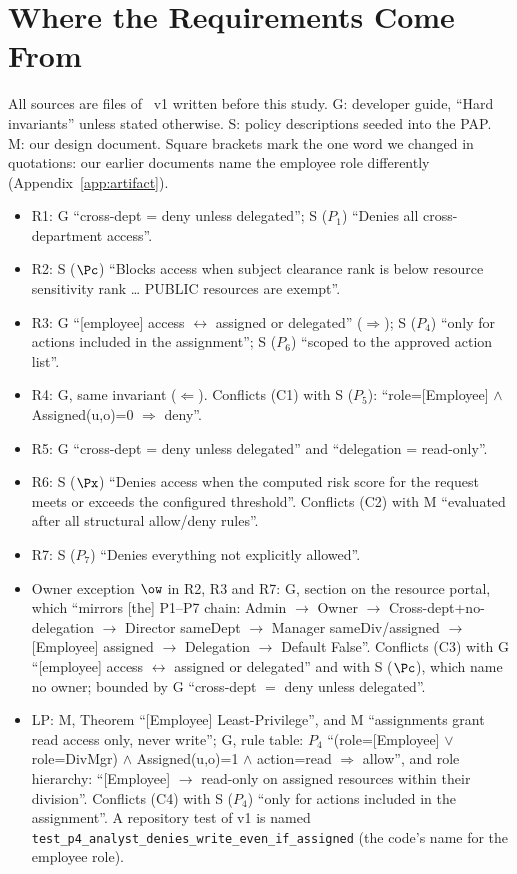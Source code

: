 


\appendix
\section{Where the Requirements Come From}
\label{app:prov}
All sources are files of \sysname~v1 written before this study. G: developer guide, ``Hard invariants'' unless
stated otherwise.
S: policy descriptions seeded into the PAP. M: our design document. Square brackets mark the one word we changed
in quotations: our earlier documents name the employee role differently (Appendix~\ref{app:artifact}).
\begin{itemize}
\item R1: G ``cross-dept = deny unless delegated''; S ($P_1$) ``Denies all cross-department access''.
\item R2: S ($\Pc$) ``Blocks access when subject clearance rank is below resource sensitivity rank \ldots{} PUBLIC
resources are exempt''.
\item R3: G ``[employee] access $\leftrightarrow$ assigned or delegated'' ($\Rightarrow$); S ($P_4$) ``only for actions
included in the assignment''; S ($P_6$) ``scoped to the approved action list''.
\item R4: G, same invariant ($\Leftarrow$). Conflicts (C1) with S ($P_5$):
``role=[Employee] $\wedge$ Assigned(u,o)=0 $\Rightarrow$\allowbreak{} deny''.
\item R5: G ``cross-dept = deny unless delegated'' and ``delegation = read-only''.
\item R6: S ($\Px$) ``Denies access when the computed risk score for the request meets or exceeds the configured
threshold''. Conflicts (C2) with M ``evaluated after all structural allow/deny rules''.
\item R7: S ($P_7$) ``Denies everything not explicitly allowed''.
\item Owner exception $\ow$ in R2, R3 and R7: G, section on the resource portal, which ``mirrors [the] P1--P7
chain: Admin $\to$ Owner $\to$ Cross-dept+no-delegation $\to$ Director sameDept $\to$ Manager sameDiv/assigned
$\to$ [Employee] assigned $\to$ Delegation $\to$ Default False''. Conflicts (C3) with G ``[employee] access
$\leftrightarrow$ assigned or delegated'' and with S ($\Pc$), which name no owner; bounded by G ``cross-dept $=$
deny unless delegated''.
\item LP: M, Theorem ``[Employee] Least-Privilege'', and M ``assignments grant read access only, never write'';
G, rule table: $P_4$ ``(role=[Employee] $\vee$ role=DivMgr) $\wedge$ Assigned(u,o)=1 $\wedge$ action=read
$\Rightarrow$ allow'', and role hierarchy: ``[Employee] $\to$ read-only on assigned resources within their division''. Conflicts (C4)
with S ($P_4$) ``only for actions included in the assignment''. A repository test of v1 is named
\texttt{test\_p4\_analyst\_denies\_write\_even\_if\_assigned} (the code's name for the employee role).
\end{itemize}

